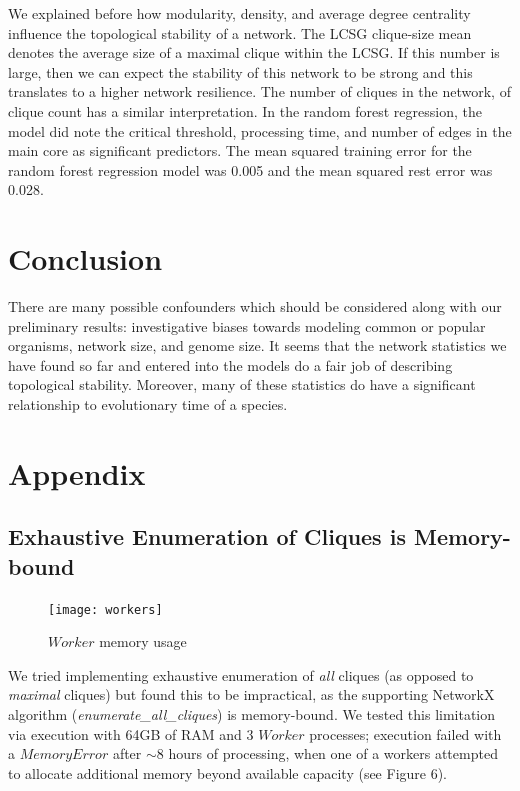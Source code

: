 \documentclass[12pt]{article}
\begin{document}
We explained before how modularity, density, and average degree centrality influence the topological stability of a network. The LCSG clique-size mean denotes the average size of a maximal clique within the LCSG. If this number is large, then we can expect the stability of this network to be strong and this translates to a higher network resilience. The number of cliques in the network, of clique count has a similar interpretation. In the random forest regression, the model did note the critical threshold, processing time, and number of edges in the main core as significant predictors. The mean squared training error for the random forest regression model was 0.005 and the mean squared rest error was 0.028.

\section{Conclusion}
There are many possible confounders which should be considered along with our preliminary results: investigative biases towards modeling common or popular organisms, network size, and genome size. It seems that the network statistics we have found so far and entered into the models do a fair job of describing topological stability. Moreover, many of these statistics do have a significant relationship to evolutionary time of a species. 
\section{Appendix}
\subsection{Exhaustive Enumeration of Cliques is Memory-bound}
\begin{figure}
  \vspace{-20pt}
  \begin{center}
    \texttt{[image: workers]}
  \end{center}
  \vspace{-20pt}
  \caption{$Worker$ memory usage}
  \vspace{-10pt}
\end{figure}
We tried implementing exhaustive enumeration of \textit{all} cliques (as opposed to \textit{maximal} cliques) but found this to be impractical, as the supporting NetworkX algorithm (\textit{enumerate\_all\_cliques}) is memory-bound. We tested this limitation via execution with 64GB of RAM and 3 $Worker$ processes; execution failed with a $MemoryError$ after $\sim8$ hours of processing, when one of a workers attempted to allocate additional memory beyond available capacity (see Figure 6).
\end{document}

